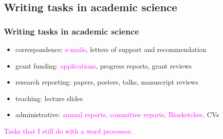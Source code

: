 \documentclass{beamer}
\begin{document}
\subsection{Writing tasks in academic science}
\begin{frame}
\frametitle{Writing tasks in academic science}
\begin{center}
\begin{Large}
\begin{itemize}[font=$\bullet$\scshape\bfseries]
\item correspondence: \textcolor{magenta}{e-mails}, letters of support and recommendation
\item grant funding: \textcolor{magenta}{applications}, progress reports, grant reviews
\item research reporting: papers, posters, talks, manuscript reviews
\item teaching: lecture slides
\item administrative: \textcolor{magenta}{annual reports, committee reports, Biosketches,} CVs
\end{itemize}
\end{Large}
\end{center}
\textcolor{magenta}{Tasks that I still do with a word processor.}
\end{frame}



\end{document}
